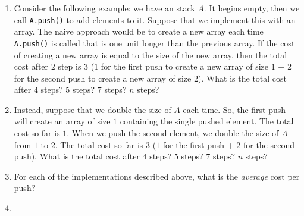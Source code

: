 \documentclass{article}
\begin{document}
\begin{enumerate}[(1)]
    \item Consider the following example: we have an stack $A$.  It
        begins empty, then we call \texttt{A.push()} to add elements to it.
        Suppose that we implement this with an array.  The naive approach would
        be to create a new array each time \texttt{A.push()} is called that is
        one unit longer than the previous array.  If the
        cost of creating a new array is equal to the size of the new array, then the total cost after
        $2$ step is $3$ ($1$ for the first push to create a new array of size
        $1$ + $2$ for the second push to create a new array of size $2$).
        What is the total cost after $4$ steps?  $5$ steps? $7$ steps? $n$ steps?
        \vspace{1in}
    \item Instead, suppose that we double the size of $A$ each time.  So, the
        first push will create an array of size $1$ containing the single pushed
        element.  The total cost so far is $1$.  When we push the second
        element, we double the size of $A$ from $1$ to $2$.
        The total cost so far is $3$ ($1$ for the first push + $2$ for the second
        push).  What is the total cost after $4$ steps? $5$ steps? $7$ steps?
        $n$ steps?
        \vspace{1in}
    \item For each of the implementations described above, what is the
        \emph{average} cost per push?
    \item
\end{enumerate}
\end{document}
